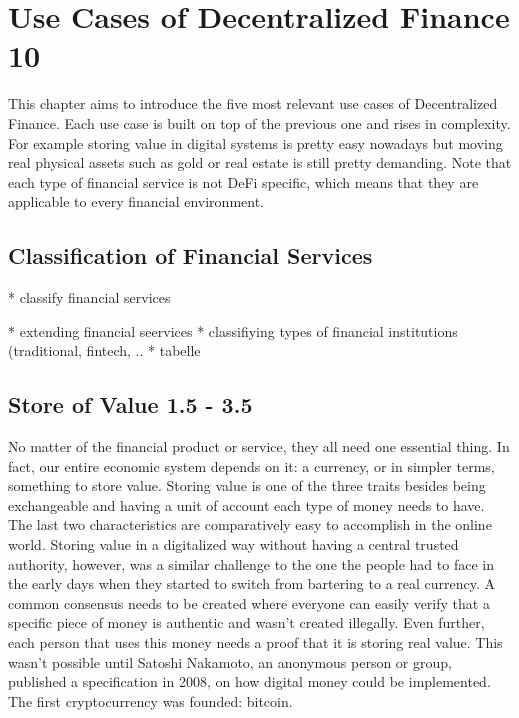 \chapter{Use Cases of Decentralized Finance 10}
\label{cha:UseCasesDecentralizedFinance}

This chapter aims to introduce the five most relevant use cases of Decentralized Finance. Each use case is built on top of the previous one and rises in complexity. For example storing value in digital systems is pretty easy nowadays but moving real physical assets such as gold or real estate is still pretty demanding. Note that each type of financial service is not DeFi specific, which means that they are applicable to every financial environment.

\section{Classification of Financial Services}
* classify financial services

* extending financial seervices
* classifiying types of financial institutions (traditional, fintech, ..
* tabelle


\section{Store of Value 1.5 - 3.5}
No matter of the financial product or service, they all need one essential thing. In fact, our entire economic system depends on it: a currency, or in simpler terms, something to store value. Storing value is one of the three traits besides being exchangeable and having a unit of account each type of money needs to have. The last two characteristics are comparatively easy to accomplish in the online world. Storing value in a digitalized way without having a central trusted authority, however, was a similar challenge to the one the people had to face in the early days when they started to switch from bartering to a real currency. A common consensus needs to be created where everyone can easily verify that a specific piece of money is authentic and wasn't created illegally. Even further, each person that uses this money needs a proof that it is storing real value. This wasn't possible until Satoshi Nakamoto, an anonymous person or group, published a specification \cite{Nakamoto2008} in 2008, on how digital money could be implemented. The first cryptocurrency was founded: bitcoin.

